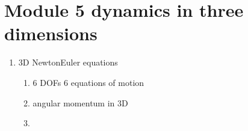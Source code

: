 \documentclass[letterpaper,10pt,english]{sphinxmanual}
\begin{document}
\chapter{Module 5 \sphinxhyphen{} dynamics in three dimensions}
\label{\detokenize{module_05/overview:module-5-dynamics-in-three-dimensions}}\label{\detokenize{module_05/overview::doc}}
\begin{enumerate}
%
\item {} 
3D Newton\sphinxhyphen{}Euler equations
\begin{enumerate}
%
\item {} 
6 DOFs \sphinxhyphen{} 6 equations of motion

\item {} 
angular momentum in 3D

\item {} 
\end{enumerate}

\end{enumerate}







\renewcommand{\indexname}{Index}
\printindex
\end{document}
